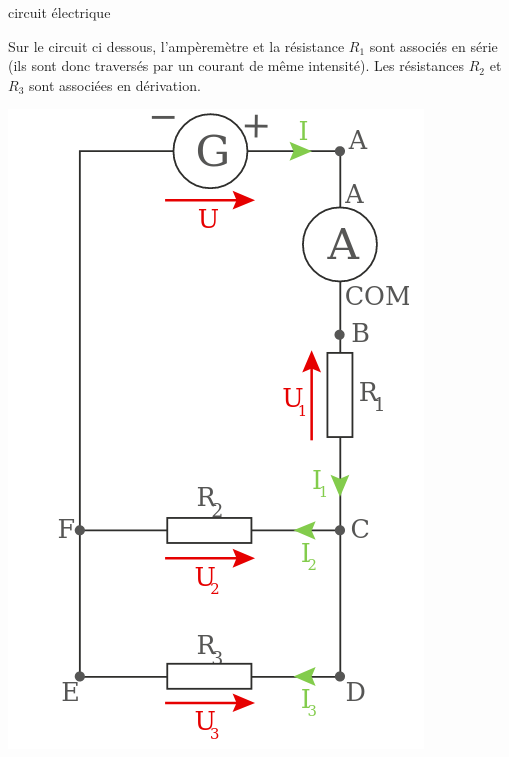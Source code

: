 \documentclass[24pt]{article}
\begin{document}
\begin{concept}{circuit électrique}
\begin{minipage}[c]{0.75\textwidth}
        Sur le circuit ci dessous, l’ampèremètre et la résistance $R_1$ sont associés en série
        (ils sont donc traversés par un courant de même intensité).
        Les résistances $R_2$ et $R_3$ sont associées en dérivation.
    \end{minipage}
    \begin{minipage}[c]{0.25\textwidth}
        \begin{center}
            \includegraphics[width=\columnwidth]{c1.png}
        \end{center}
    \end{minipage}




\end{concept}
\end{document}
